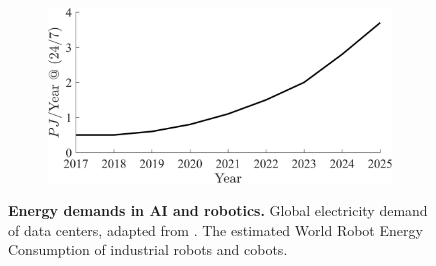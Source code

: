 \documentclass[12pt]{article}
\begin{document}
\begin{figure}[!t]
\begin{subfigure}[t]{0.32\textwidth}
		\subcaption{}
		\includegraphics[width=\textwidth]{cb_energy_projections.png} \label{fig:cobot_energy}
	\end{subfigure}	
	\hspace*{\fill}
	\caption[] {\label{fig:energy_demands_AI_robotics} \textbf{Energy demands in AI and robotics.}  Global electricity demand of data centers, adapted from \cite{andrae2015global}. The estimated World Robot Energy Consumption of  industrial robots and  cobots.}
\end{figure}

\end{document}
